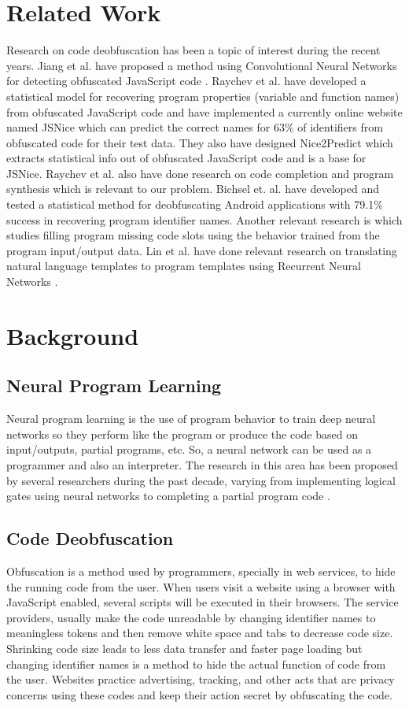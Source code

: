 \documentclass[acmsmall]{acmart}
\begin{document}
\section{Related Work}
Research on code deobfuscation has been a topic of interest during the recent years. Jiang et al. have proposed a method using Convolutional Neural Networks for detecting obfuscated JavaScript code \cite{jiangcnn}. Raychev et al. have developed a statistical model for recovering program properties (variable and function names) from obfuscated JavaScript code \cite{jsnice1} and have implemented a currently online website named JSNice \cite{jsnice3} which can predict the correct names for 63\% of identifiers from obfuscated code for their test data. They also have designed Nice2Predict \cite{nice2predict} which extracts statistical info out of obfuscated JavaScript code and is a base for JSNice. Raychev et al. also have done research on code completion and program synthesis \cite{Raychev2014} which is relevant to our problem. Bichsel et. al. have developed and tested a statistical method for deobfuscating Android applications \cite{bichselandroid} with 79.1\% success in recovering program identifier names. Another relevant research is \cite{forth} which studies filling program missing code slots using the behavior trained from the program input/output data. Lin et al. have done relevant research on translating natural language templates to program templates using Recurrent Neural Networks \cite{nlprnn}.

\section{Background}
\subsection{Neural Program Learning}
Neural program learning is the use of program behavior to train deep neural networks so they perform like the program or produce the code based on input/outputs, partial programs, etc. So, a neural network can be used as a programmer and also an interpreter. The research in this area has been proposed by several researchers during the past decade, varying from implementing logical gates using neural networks \cite{neto} to completing a partial program code \cite{forth}.
\subsection{Code Deobfuscation}
Obfuscation is a method used by programmers, specially in web services, to hide the running code from the user. When users visit a website using a browser with JavaScript enabled, several scripts will be executed in their browsers. The service providers, usually make the code unreadable by changing identifier names to meaningless tokens and then remove white space and tabs to decrease code size. Shrinking code size leads to less data transfer and faster page loading but changing identifier names is a method to hide the actual function of code from the user. Websites practice advertising, tracking, and other acts that are privacy concerns using these codes and keep their action secret by obfuscating the code.
\end{document}

